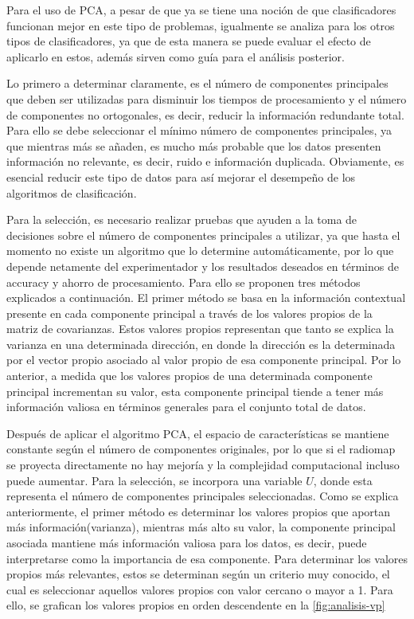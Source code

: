Para el uso de PCA, a pesar de que ya se tiene una noción de que clasificadores funcionan mejor en este tipo de problemas, igualmente se analiza para los otros tipos de clasificadores, ya que de esta manera se puede evaluar el efecto de aplicarlo en estos, además sirven como guía para el análisis posterior.

Lo primero a determinar claramente, es el número de componentes principales que deben ser utilizadas para disminuir los tiempos de procesamiento y el número de componentes no ortogonales, es decir, reducir la información redundante total. Para ello se debe seleccionar el mínimo número de componentes principales, ya que mientras más se añaden, es mucho más probable que los datos presenten información no relevante, es decir, ruido e información duplicada. Obviamente, es esencial reducir este tipo de datos para así mejorar el desempeño de los algoritmos de clasificación.

Para la selección, es necesario realizar pruebas que ayuden a la toma de decisiones sobre el número de componentes principales a utilizar, ya que hasta el momento no existe un algoritmo que lo determine automáticamente, por lo que depende netamente del experimentador y los resultados deseados en términos de accuracy y ahorro de procesamiento. Para ello se proponen tres métodos explicados a continuación. El primer método se basa en la información contextual presente en cada componente principal a través de los valores propios de la matriz de covarianzas. Estos valores propios representan que tanto se explica la varianza en una determinada dirección, en donde la dirección es la determinada por el vector propio asociado al valor propio de esa componente principal. Por lo anterior, a medida que los valores propios de una determinada componente principal incrementan su valor, esta componente principal tiende a tener más información valiosa en términos generales para el conjunto total de datos. 

Después de aplicar el algoritmo PCA, el espacio de características se mantiene constante según el número de componentes originales, por lo que si el radiomap se proyecta directamente no hay mejoría y la complejidad computacional incluso puede aumentar. Para la selección, se incorpora una variable $U$, donde esta representa el número de componentes principales seleccionadas. Como se explica anteriormente, el primer método es determinar los valores propios que aportan más información(varianza), mientras más alto su valor, la componente principal asociada mantiene más información valiosa para los datos, es decir, puede interpretarse como la importancia de esa componente. Para determinar los valores propios más relevantes, estos se determinan según un criterio muy conocido, el cual es seleccionar aquellos valores propios con valor cercano o mayor a 1. Para ello, se grafican los valores propios en orden descendente en la \autoref{fig:analisis-vp}

